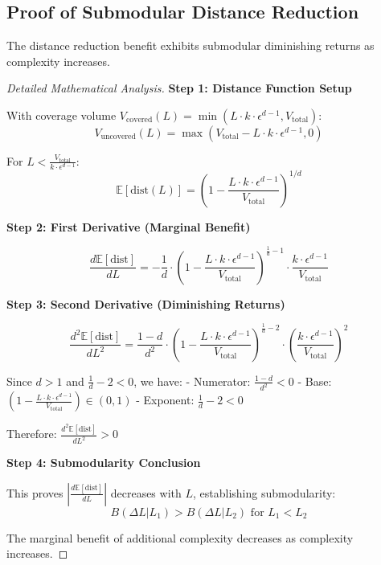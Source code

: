 \subsection{Proof of Submodular Distance Reduction}
\label{subsec:submodular-proof}

\begin{theorem}
The distance reduction benefit exhibits submodular diminishing returns as complexity increases.
\end{theorem}

\begin{proof}[Detailed Mathematical Analysis]
\textbf{Step 1: Distance Function Setup}

With coverage volume $V_{\text{covered}}(L) = \min(L \cdot k \cdot \epsilon^{d-1}, V_{\text{total}})$:
$$V_{\text{uncovered}}(L) = \max(V_{\text{total}} - L \cdot k \cdot \epsilon^{d-1}, 0)$$

For $L < \frac{V_{\text{total}}}{k \cdot \epsilon^{d-1}}$:
$$\mathbb{E}[\text{dist}(L)] = \left(1 - \frac{L \cdot k \cdot \epsilon^{d-1}}{V_{\text{total}}}\right)^{1/d}$$

\textbf{Step 2: First Derivative (Marginal Benefit)}

$$\frac{d\mathbb{E}[\text{dist}]}{dL} = -\frac{1}{d} \cdot \left(1 - \frac{L \cdot k \cdot \epsilon^{d-1}}{V_{\text{total}}}\right)^{\frac{1}{d}-1} \cdot \frac{k \cdot \epsilon^{d-1}}{V_{\text{total}}}$$

\textbf{Step 3: Second Derivative (Diminishing Returns)}

$$\frac{d^2\mathbb{E}[\text{dist}]}{dL^2} = \frac{1-d}{d^2} \cdot \left(1 - \frac{L \cdot k \cdot \epsilon^{d-1}}{V_{\text{total}}}\right)^{\frac{1}{d}-2} \cdot \left(\frac{k \cdot \epsilon^{d-1}}{V_{\text{total}}}\right)^2$$

Since $d > 1$ and $\frac{1}{d}-2 < 0$, we have:
- Numerator: $\frac{1-d}{d^2} < 0$
- Base: $\left(1 - \frac{L \cdot k \cdot \epsilon^{d-1}}{V_{\text{total}}}\right) \in (0,1)$
- Exponent: $\frac{1}{d}-2 < 0$

Therefore: $\frac{d^2\mathbb{E}[\text{dist}]}{dL^2} > 0$

\textbf{Step 4: Submodularity Conclusion}

This proves $\left|\frac{d\mathbb{E}[\text{dist}]}{dL}\right|$ decreases with $L$, establishing submodularity:
$$B(\Delta L | L_1) > B(\Delta L | L_2) \text{ for } L_1 < L_2$$

The marginal benefit of additional complexity decreases as complexity increases.
\end{proof}

